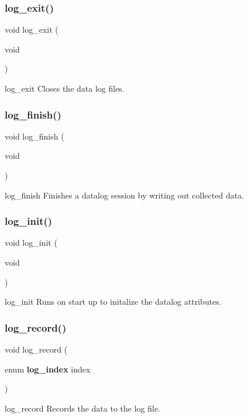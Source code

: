\subsubsection{log\+\_\+exit()}
{\footnotesize\ttfamily void log\+\_\+exit (\begin{DoxyParamCaption}\item[{void}]{ }\end{DoxyParamCaption})}

log\+\_\+exit Closes the data log files. \mbox{\label{log_8h_afbd3419508e3dca941b60ca40f3ff6cd}} 
\subsubsection{log\+\_\+finish()}
{\footnotesize\ttfamily void log\+\_\+finish (\begin{DoxyParamCaption}\item[{void}]{ }\end{DoxyParamCaption})}

log\+\_\+finish Finishes a datalog session by writing out collected data. \mbox{\label{log_8h_a2508fad025e49f9746b6c178dce6917e}} 
\subsubsection{log\+\_\+init()}
{\footnotesize\ttfamily void log\+\_\+init (\begin{DoxyParamCaption}\item[{void}]{ }\end{DoxyParamCaption})}

log\+\_\+init Runs on start up to initalize the datalog attributes. \mbox{\label{log_8h_a93a87f7303b376ec092e84b52ca618a4}} 
\subsubsection{log\+\_\+record()}
{\footnotesize\ttfamily void log\+\_\+record (\begin{DoxyParamCaption}\item[{enum \textbf{ log\+\_\+index}}]{index }\end{DoxyParamCaption})}

log\+\_\+record Records the data to the log file. \mbox{\label{log_8h_a876e1f3e961256969160f51cb43b261e}} 
